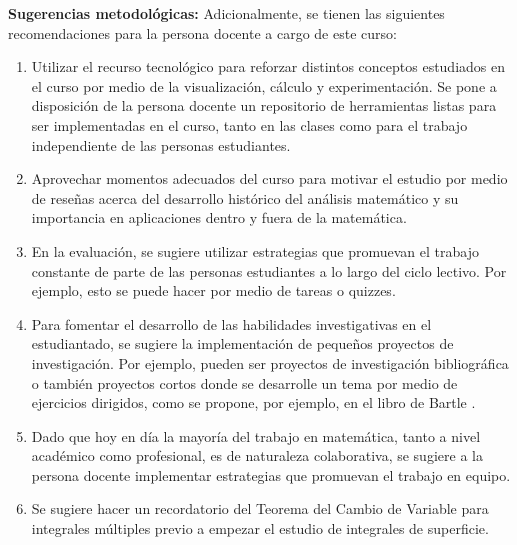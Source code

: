 \begin{refsection}
\textbf{Sugerencias metodológicas:} Adicionalmente, se tienen las siguientes recomendaciones para la persona docente a cargo de este curso:
\begin{enumerate}
    \item Utilizar el recurso tecnológico para reforzar distintos conceptos estudiados en el curso por medio de la visualización, cálculo y experimentación. Se pone a disposición de la persona docente un repositorio de herramientas listas para ser implementadas en el curso, tanto en las clases como para el trabajo independiente de las personas estudiantes.
    \item Aprovechar momentos adecuados del curso para motivar el estudio por medio de reseñas acerca del desarrollo histórico del análisis matemático y su importancia en aplicaciones dentro y fuera de la matemática.
    \item En la evaluación, se sugiere utilizar estrategias que promuevan el trabajo constante de parte de las personas estudiantes a lo largo del ciclo lectivo. Por ejemplo, esto se puede hacer por medio de tareas o quizzes.
    \item Para fomentar el desarrollo de las habilidades investigativas en el estudiantado, se sugiere la implementación de pequeños proyectos de investigación. Por ejemplo, pueden ser proyectos de investigación bibliográfica o también proyectos cortos donde se desarrolle un tema por medio de ejercicios dirigidos, como se propone, por ejemplo, en el libro de Bartle \cite{Bar76}.
    \item Dado que hoy en día la mayoría del trabajo en matemática, tanto a nivel académico como profesional, es de naturaleza colaborativa, se sugiere a la persona docente implementar estrategias que promuevan el trabajo en equipo.
    \item Se sugiere hacer un recordatorio del Teorema del Cambio de Variable para integrales múltiples previo a empezar el estudio de integrales de superficie.
\end{enumerate}




\nocite{Abb15}
\nocite{Apo84}
\nocite{Apo85} 
\nocite{Bar76}
\nocite{BS11}
\nocite{Apo76}
\nocite{Ros13}
\nocite{TBB08}
\nocite{Rud76}
\nocite{Piz06}
\nocite{Buc03}
\nocite{Fit09}
\nocite{Spi65}
\nocite{MT03}

\printbibliography[heading=subbibliography]
\end{refsection}

